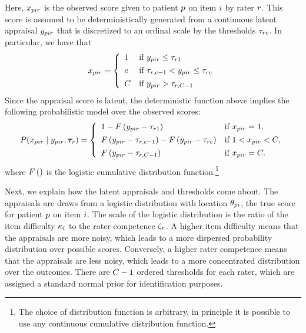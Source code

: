 \documentclass[a4paper,11pt]{article}
\begin{document}
Here, $x_{pir}$ is the observed score given to patient $p$ on item $i$ by rater $r$.
This score is assumed to be deterministically generated from a continuous latent appraisal $y_{pir}$ that is discretized to an ordinal scale by the thresholds $\tau_{rc}$.
In particular, we have that
\begin{align*}
\oneScore =
\left\{\begin{array}{ll}
1		& \text{if }  \Appraisal_{\Ipatient\Iitem\Irater} \leq \Threshold_{\Irater 1} \\[4pt]
\Incat	& \text{if }  \Threshold_{\Irater, \Incat - 1} < \Appraisal_{\Ipatient\Iitem\Irater} \leq \Threshold_{\Irater\Incat} \\[4pt]
\Tncat	& \text{if }  \Appraisal_{\Ipatient\Iitem\Irater} > \Threshold_{\Irater,\Tncat-1}
\end{array} \right.
\end{align*}
Since the appraisal score is latent, the deterministic function above implies the following probabilistic model over the observed scores:
\begin{align*}
P(\oneScore\mid \oneAppraisal,\bm{\Threshold}_{\Irater}) =
\left\{\begin{array}{ll}
1 - \cdf{\Appraisal_{\Ipatient\Iitem\Irater} - \Threshold_{\Irater 1}}         & \text{if } \oneScore = 1, \\[4pt]
\cdf{\oneAppraisal - \Threshold_{\Irater,\Incat-1}} -
\cdf{\oneAppraisal - \Threshold_{\Irater\Incat}}         & \text{if } 1 < \oneScore < \Tncat,\\[4pt]
\cdf{\oneAppraisal - \Threshold_{\Irater,\Tncat-1}}       & \text{if } \oneScore = \Tncat.
\end{array} \right.
\end{align*}
where $F\left(\right)$ is the logistic cumulative distribution function.\footnote{%
	The choice of distribution function is arbitrary, in principle it is possible to use any continuous cumulative distribution function.
}

Next, we explain how the latent appraisals and thresholds come about.
The appraisals are draws from a logistic distribution with location $\theta_{pi}$, the true score for patient $p$ on item $i$. The scale of the logistic distribution is the ratio of the item difficulty $\kappa_i$ to the rater competence $\zeta_r$.
A higher item difficulty means that the appraisals are more noisy, which leads to a more dispersed probability distribution over possible scores.
Conversely, a higher rater competence means that the appraisals are less noisy, which leads to a more concentrated distribution over the outcomes.
There are $\Tncat - 1$ ordered thresholds for each rater, which are assigned a standard normal prior for identification purposes.
\end{document}
